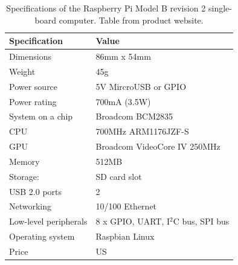 \begin{table}[h]
	\centering
	\begin{tabular}{ | m{4cm} || m{6cm} | }
		\hline
		\textbf{Specification}	& \textbf{Value} \\ \hline
		Dimensions				& 86mm x 54mm \\ \hline
		Weight					& 45g \\ \hline
		Power source			& 5V MircroUSB or GPIO \\ \hline
		Power rating			& 700mA (3.5W) \\ \hline
		System on a chip		& Broadcom BCM2835 \\ \hline
		CPU						& 700MHz ARM1176JZF-S \\ \hline
		GPU						& Broadcom VideoCore IV 250MHz \\ \hline
		Memory					& 512MB \\ \hline
		Storage:				& SD card slot \\ \hline
		USB	2.0 ports			& 2 \\ \hline
		Networking				& 10/100 Ethernet \\ \hline
		Low-level peripherals	& 8 x GPIO, UART, I$^{2}$C bus, SPI bus \\ \hline
		Operating system		& Raspbian Linux \\ \hline
		Price					& US \textdollar 35 \\ \hline
	\end{tabular}
	\caption{Specifications of the Raspberry Pi Model B revision 2 single-board computer. Table from product website\protect\footnotemark.}
	\label{tbl:pi}
\end{table}

